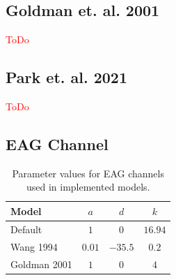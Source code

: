 \documentclass[../main.tex]{subfiles}
\begin{document}
\subsection{Goldman et. al. 2001}

\textcolor{red}{ToDo}

\subsection{Park et. al. 2021}

\textcolor{red}{ToDo}


\subsection{EAG Channel} \label{appendix:parameters_eag_channel}



\begin{table}[t!]
    \centering
    \begin{tabular}{|l||c|c|c|}
    \hline
    \textbf{Model} & $a$ & $d$ & $k$ \\
    \hline
    \hline
    Default \parencite{bronkRegulationEagCa22018}  & $1$       & $0$        & $16.94$ \\
    Wang 1994     & $0.01$    & $-35.5$    & $0.2$  \\
    Goldman 2001  & $1$       & $0$        & $4$    \\
    \hline
    \end{tabular}
    \caption{Parameter values for EAG channels used in implemented models.}
    \label{tab:eag_parameters}
\end{table}
\end{document}
